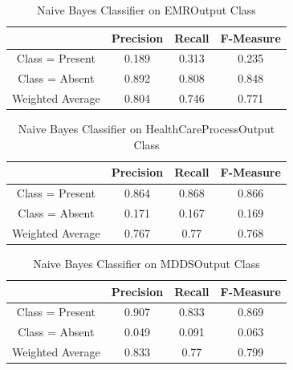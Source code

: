 \documentclass[11pt, notitlepage,abstracton,oneside]{article}   	%
\begin{document}
\begin{table}[H]
    \caption{Naive Bayes Classifier on EMROutput Class}
        \begin{center}
        \begin{tabular}{|c|c|c|c|}
            \hline
            & Precision & Recall & F-Measure \\ \hline
            Class = Present & 0.189 & 0.313 & 0.235 \\ \hline
            Class = Absent & 0.892 & 0.808 & 0.848 \\ \hline
            Weighted Average & 0.804 & 0.746 & 0.771\\ \hline
        \end{tabular}
        \end{center}
    \label{default}
\end{table}%

\begin{table}[H]
    \caption{Naive Bayes Classifier on HealthCareProcessOutput Class}
        \begin{center}
        \begin{tabular}{|c|c|c|c|}
            \hline
            & Precision & Recall & F-Measure \\ \hline
            Class = Present & 0.864 & 0.868 & 0.866 \\ \hline
            Class = Absent & 0.171 & 0.167 & 0.169 \\ \hline
            Weighted Average & 0.767 & 0.77 & 0.768 \\ \hline
        \end{tabular}
        \end{center}
    \label{default}
\end{table}%

\begin{table}[H]
    \caption{Naive Bayes Classifier on MDDSOutput Class}
        \begin{center}
        \begin{tabular}{|c|c|c|c|}
            \hline
            & Precision & Recall & F-Measure \\ \hline
            Class = Present & 0.907 & 0.833 & 0.869 \\ \hline
            Class = Absent & 0.049 & 0.091 & 0.063 \\ \hline
            Weighted Average & 0.833 & 0.77 & 0.799 \\ \hline
        \end{tabular}
        \end{center}
    \label{default}
\end{table}%
\end{document}
